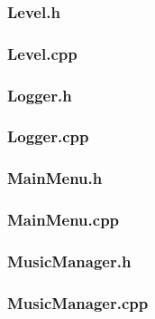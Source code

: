 \documentclass{article}
\begin{document}
\subsubsection{Level.h}
	 
	 				
\subsubsection{Level.cpp}
	 
	 				
\subsubsection{Logger.h}
	 
	 				
\subsubsection{Logger.cpp}
	
	 				
\subsubsection{MainMenu.h}
	

\subsubsection{MainMenu.cpp}
		 
 				
\subsubsection{MusicManager.h}
	
	 				
\subsubsection{MusicManager.cpp}
	
	 				
\end{document}
